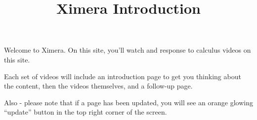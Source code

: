 \documentclass[handout]{ximera}
\title{Ximera Introduction}
\begin{document}
\begin{abstract}
\end{abstract}

\maketitle

Welcome to Ximera. On this site, you'll watch and response to calculus videos on this site.

Each set of videos will include an introduction page to get you thinking about the content, then the videos themselves, and a follow-up page.

Also - please note that if a page has been updated, you will see an orange glowing ``update'' button in the top right corner of the screen.
\end{document}

